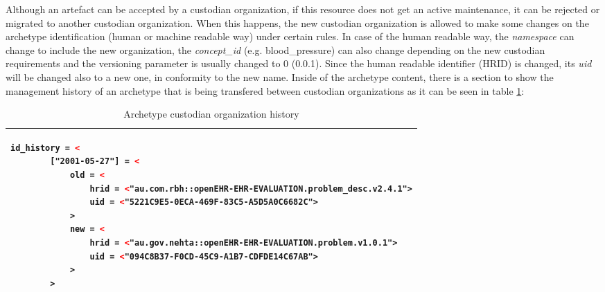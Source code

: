 \documentclass[mim_thesis.tex]{subfiles}
\begin{document}
Although an artefact can be accepted by a custodian organization, if this resource does not get an active maintenance, it can be rejected or migrated to another custodian organization. When this happens, the new custodian organization is allowed to make some changes on the archetype identification (human or machine readable way) under certain rules. In case of the human readable way, the \textit{namespace} can change to include the new organization, the \textit{concept\_id} (e.g. blood\_pressure) can also change depending on the new custodian requirements and the versioning parameter is usually changed to 0 (0.0.1). Since the human readable identifier (HRID) is changed, its \textit{uid} will be changed also to a new one, in conformity to the new name. Inside of the archetype content, there is a section to show the management history of an archetype that is being transfered between custodian organizations as it can be seen in table \ref{tab:arch_co_h}:

\begin{table}[H]
\caption{Archetype custodian organization history \citep{openehrckmgover2018}}
\label{tab:arch_co_h}
\centering
\begin{tabular}{l}
\toprule[2pt]
\begin{lstlisting}[language=XML]
    id_history = <
        ["2001-05-27"] = <
            old = <
                hrid = <"au.com.rbh::openEHR-EHR-EVALUATION.problem_desc.v2.4.1">
                uid = <"5221C9E5-0ECA-469F-83C5-A5D5A0C6682C">
            >
            new = <
                hrid = <"au.gov.nehta::openEHR-EHR-EVALUATION.problem.v1.0.1">
                uid = <"094C8B37-F0CD-45C9-A1B7-CDFDE14C67AB">
            >
        >
\end{lstlisting}
\tabularnewline \bottomrule[2pt]
\end{tabular}
\end{table}
\end{document}
